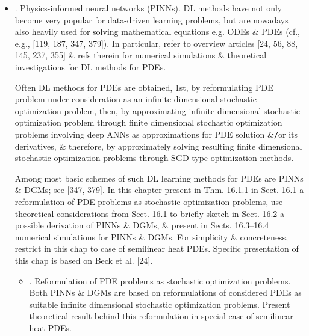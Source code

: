 \documentclass{article}
\begin{document}
\begin{itemize}
	\item {. Physics-informed neural networks (PINNs).} DL methods have not only become very popular for data-driven learning problems, but are nowadays also heavily used for solving mathematical equations e.g. ODEs \& PDEs (cf., e.g., [119, 187, 347, 379]). In particular, refer to overview articles [24, 56, 88, 145, 237, 355] \& refs therein for numerical simulations \& theoretical investigations for DL methods for PDEs.
	
	Often DL methods for PDEs are obtained, 1st, by reformulating PDE problem under consideration as an infinite dimensional stochastic optimization problem, then, by approximating infinite dimensional stochastic optimization problem through finite dimensional stochastic optimization problems involving deep ANNs as approximations for PDE solution \&{\tt/}or its derivatives, \& therefore, by approximately solving resulting finite dimensional stochastic optimization problems through SGD-type optimization methods.
	
	Among most basic schemes of such DL learning methods for PDEs are PINNs \& DGMs; see [347, 379]. In this chapter present in Thm. 16.1.1 in Sect. 16.1 a reformulation of PDE problems as stochastic optimization problems, use theoretical considerations from Sect. 16.1 to briefly sketch in Sect. 16.2 a possible derivation of PINNs \& DGMs, \& present in Sects. 16.3--16.4 numerical simulations for PINNs \& DGMs. For simplicity \& concreteness, restrict in this chap to case of semilinear heat PDEs. Specific presentation of this chap is based on Beck et al. [24].
	\begin{itemize}
		\item {. Reformulation of PDE problems as stochastic optimization problems.} Both PINNs \& DGMs are based on reformulations of considered PDEs as suitable infinite dimensional stochastic optimization problems. Present theoretical result behind this reformulation in special case of semilinear heat PDEs.
		

\end{itemize}
\end{itemize}
\end{document}
